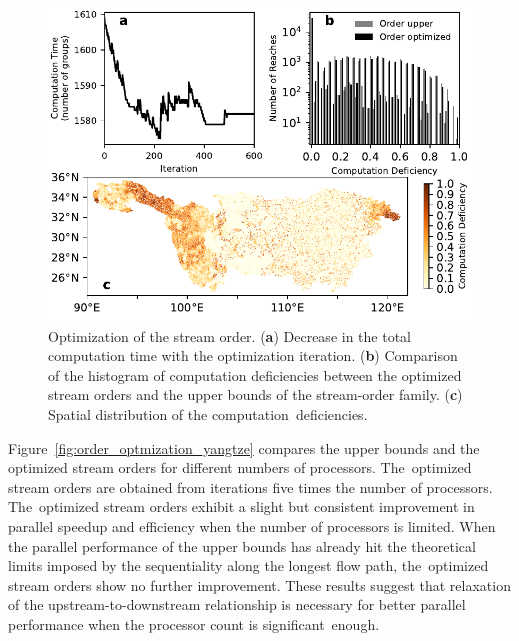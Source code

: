 \documentclass[water,article,accept,pdftex,moreauthors]{Definitions/mdpi}
\begin{document}
\begin{figure}[H]
    \includegraphics[width=13.5 cm]{fig/optimization_iteration_yangtze.pdf}
    \caption{Optimization of the stream order. (\textbf{a}) Decrease in the total computation time with the optimization iteration. (\textbf{b}) Comparison of the histogram of computation deficiencies between the optimized stream orders and the upper bounds of the stream-order family. (\textbf{c}) Spatial distribution of the computation~deficiencies. \label{fig:optimization_iteration_yangtze}}
\end{figure}

Figure~\ref{fig:order_optmization_yangtze} compares the upper bounds and the optimized stream orders for different numbers of processors. The~optimized stream orders are obtained from iterations five times the number of processors. The~optimized stream orders exhibit a slight but consistent improvement in parallel speedup and efficiency when the number of processors is limited. When the parallel performance of the upper bounds has already hit the theoretical limits imposed by the sequentiality along the longest flow path, the~optimized stream orders show no further improvement. These results suggest that relaxation of the upstream-to-downstream relationship is necessary for better parallel performance when the processor count is significant~enough.
\end{document}
